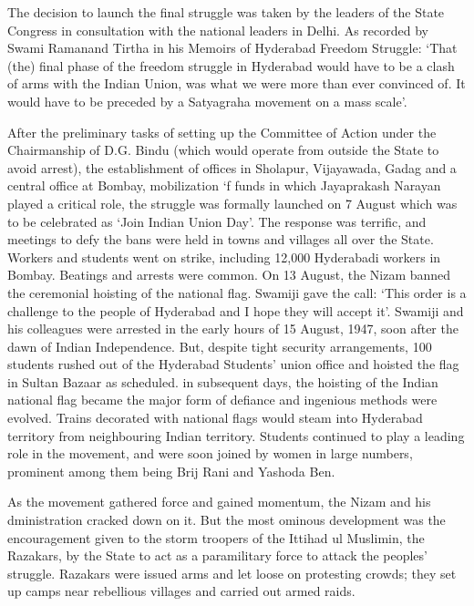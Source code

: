 \begin{multicols}{2}
The decision to launch the final struggle was taken by the leaders of the State Congress in consultation with the national leaders in Delhi. As recorded by Swami Ramanand Tirtha in his Memoirs of Hyderabad Freedom Struggle: `That (the) final phase of the freedom struggle in Hyderabad would have to be a clash of arms with the Indian Union, was what we were more than ever convinced of. It would have to be preceded by a Satyagraha movement on a mass scale'. 

After the preliminary tasks of setting up the Committee of Action under the Chairmanship of D.G. Bindu (which would operate from outside the State to avoid arrest), the establishment of offices in Sholapur, Vijayawada, Gadag and a central office at Bombay, mobilization `f funds in which Jayaprakash Narayan played a critical role, the struggle was formally launched on 7 August which was to be celebrated as `Join Indian Union Day'. The response was terrific, and meetings to defy the bans were held in towns and villages all over the State. Workers and students went on strike, including 12,000 Hyderabadi workers in Bombay. Beatings and arrests were common. On 13 August, the Nizam banned the ceremonial hoisting of the national flag. Swamiji gave the call: `This order is a challenge to the people of Hyderabad and I hope they will accept it'. Swamiji and his colleagues were arrested in the early hours of 15 August, 1947, soon after the dawn of Indian Independence. But, despite tight security arrangements, 100 students rushed out of the Hyderabad Students' union office and hoisted the flag in Sultan Bazaar as scheduled. in subsequent days, the hoisting of the Indian national flag became the major form of defiance and ingenious methods were evolved. Trains decorated with national flags would steam into Hyderabad territory from neighbouring Indian territory. Students continued to play a leading role in the movement, and were soon joined by women in large numbers, prominent among them being Brij Rani and Yashoda Ben. 

As the movement gathered force and gained momentum, the Nizam and his dministration cracked down on it. But the most ominous development was the encouragement given to the storm troopers of the Ittihad ul Muslimin, the Razakars, by the State to act as a paramilitary force to attack the peoples' struggle. Razakars were issued arms and let loose on protesting crowds; they set up camps near rebellious villages and carried out armed raids. 


\end{multicols}
